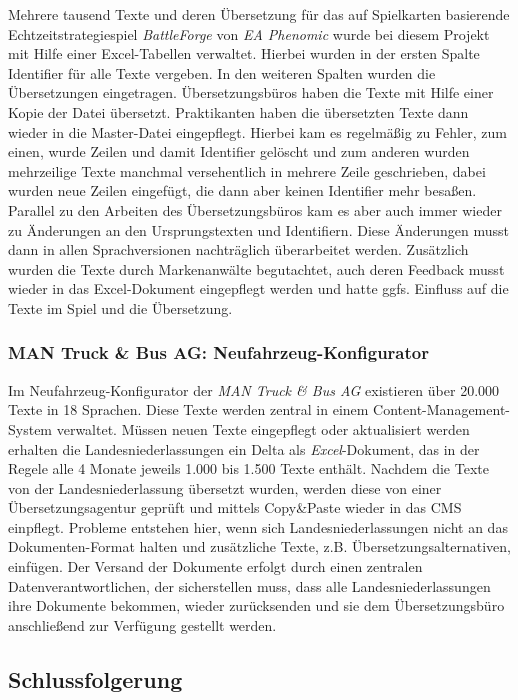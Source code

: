 Mehrere tausend Texte und deren Übersetzung für das auf Spielkarten basierende Echtzeitstrategiespiel \emph{BattleForge} von \emph{EA Phenomic} wurde bei diesem Projekt mit Hilfe einer Excel-Tabellen verwaltet. Hierbei wurden in der ersten Spalte Identifier für alle Texte vergeben. In den weiteren Spalten wurden die Übersetzungen eingetragen. Übersetzungsbüros haben die Texte mit Hilfe einer Kopie der Datei übersetzt. Praktikanten haben die übersetzten Texte dann wieder in die Master-Datei eingepflegt. Hierbei kam es regelmäßig zu Fehler, zum einen, wurde Zeilen und damit Identifier gelöscht und zum anderen wurden mehrzeilige Texte manchmal versehentlich in mehrere Zeile geschrieben, dabei wurden neue Zeilen eingefügt, die dann aber keinen Identifier mehr besaßen. Parallel zu den Arbeiten des Übersetzungsbüros kam es aber auch immer wieder zu Änderungen an den Ursprungstexten und Identifiern. Diese Änderungen musst dann in allen Sprachversionen nachträglich überarbeitet werden. Zusätzlich wurden die Texte durch Markenanwälte begutachtet, auch deren Feedback musst wieder in das Excel-Dokument eingepflegt werden und hatte ggfs. Einfluss auf die Texte im Spiel und die Übersetzung.

\subsubsection{MAN Truck \& Bus AG: Neufahrzeug-Konfigurator}

Im Neufahrzeug-Konfigurator der \emph{MAN Truck \& Bus AG} existieren über 20.000 Texte in 18 Sprachen. Diese Texte werden zentral in einem Content-Management-System verwaltet. Müssen neuen Texte eingepflegt oder aktualisiert werden erhalten die Landesniederlassungen ein Delta als \emph{Excel}-Dokument, das in der Regele alle 4 Monate jeweils 1.000 bis 1.500 Texte enthält. Nachdem die Texte von der Landesniederlassung übersetzt wurden, werden diese von einer Übersetzungsagentur geprüft und mittels Copy\&Paste wieder in das CMS einpflegt.  Probleme entstehen hier, wenn sich Landesniederlassungen nicht an das Dokumenten-Format halten und zusätzliche Texte, z.B. Übersetzungsalternativen, einfügen. Der Versand der Dokumente erfolgt durch einen zentralen Datenverantwortlichen, der sicherstellen muss, dass alle Landesniederlassungen ihre Dokumente bekommen, wieder zurücksenden und sie dem Übersetzungsbüro anschließend zur Verfügung gestellt werden.

\subsection{Schlussfolgerung}\label{l:schlussfolgerung}

